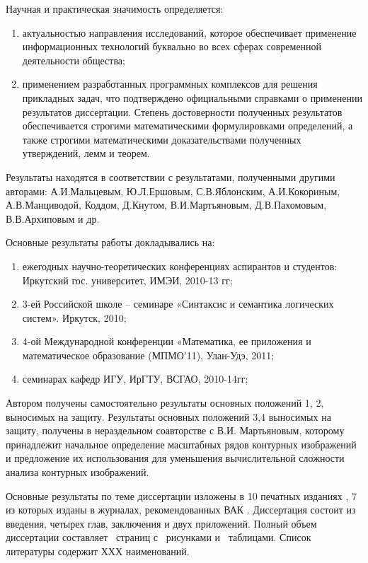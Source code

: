 \noindent
Научная и практическая значимость определяется:
\begin{enumerate}
\item актуальностью направления исследований, которое обеспечивает применение информационных технологий буквально во всех сферах современной деятельности общества;
\item применением разработанных программных комплексов для решения прикладных задач, что подтверждено официальными справками о применении результатов диссертации.
Степень достоверности полученных результатов обеспечивается строгими математическими формулировками определений, а также строгими математическими доказательствами полученных утверждений, лемм и теорем.
\end{enumerate}
Результаты находятся в соответствии с результатами, полученными другими авторами: А.И.Мальцевым\cite{D12}, Ю.Л.Ершовым\cite{D12}, С.В.Яблонским\cite{D21}, А.И.Кокориным\cite{D10}, А.В.Манциводой\cite{D13},  Коддом\cite{D24,D25}, Д.Кнутом\cite{D9}, В.И.Мартьяновым\cite{D14}, Д.В.Пахомовым\cite{D16}, В.В.Архиповым\cite{D15} и др\cite{D1,D2,D3,D11}.


\noindent
Основные результаты работы докладывались на: 
\begin{enumerate}
	\item ежегодных научно-теоретических конференциях аспирантов и студентов:  Иркутский  гос. университет, ИМЭИ, 2010-13 гг;
	\item 3-ей Российской школе – семинаре «Синтаксис и семантика логических систем». Иркутск, 2010;
	\item 4-ой Международной конференции «Математика, ее приложения и математическое образование (МПМО’11),  Улан-Удэ, 2011;
	\item семинарах кафедр ИГУ, ИрГТУ, ВСГАО, 2010-14гг;
\end{enumerate}

Автором получены самостоятельно результаты основных положений 1, 2,  выносимых  на защиту.  Результаты основных положений 3,4  выносимых  на защиту, получены в нераздельном соавторстве с В.И. Мартьяновым, которому принадлежит начальное определение масштабных рядов контурных изображений и предложение их использования для уменьшения вычислительной сложности анализа контурных изображений.

Основные результаты по теме диссертации изложены в 10 печатных изданиях \cite{D5,D6,D7,D8, D15,D16,D17,D18,D19,D20}, 7 из которых изданы в журналах, рекомендованных ВАК \cite{D6,D7,D8, D15,D17,D19,D20}. Диссертация состоит из введения, четырех глав, заключения и двух приложений. Полный объем диссертации составляет \pageref{LastPage}\ страниц с \totalfigures\ рисунками и \totaltables\ таблицами. Список литературы содержит ХХХ наименований.
\clearpage